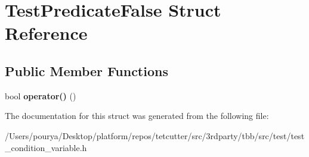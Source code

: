 \hypertarget{structTestPredicateFalse}{}\section{Test\+Predicate\+False Struct Reference}
\label{structTestPredicateFalse}
\subsection*{Public Member Functions}
\begin{DoxyCompactItemize}
\item 
\hypertarget{structTestPredicateFalse_aef2d3bb3eeef3d69a59488e5fe2c319e}{}bool {\bfseries operator()} ()\label{structTestPredicateFalse_aef2d3bb3eeef3d69a59488e5fe2c319e}

\end{DoxyCompactItemize}


The documentation for this struct was generated from the following file\+:\begin{DoxyCompactItemize}
\item 
/\+Users/pourya/\+Desktop/platform/repos/tetcutter/src/3rdparty/tbb/src/test/test\+\_\+condition\+\_\+variable.\+h\end{DoxyCompactItemize}
